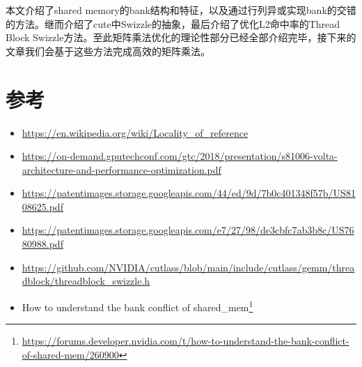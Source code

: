 本文介绍了shared memory的bank结构和特征，以及通过行列异或实现bank的交错的方法。继而介绍了cute中Swizzle的抽象，最后介绍了优化L2命中率的Thread Block Swizzle方法。至此矩阵乘法优化的理论性部分已经全部介绍完毕，接下来的文章我们会基于这些方法完成高效的矩阵乘法。

\section{参考}

\begin{itemize}
  \item \url{https://en.wikipedia.org/wiki/Locality_of_reference}
  \item \url{https://on-demand.gputechconf.com/gtc/2018/presentation/s81006-volta-architecture-and-performance-optimization.pdf}
  \item \url{https://patentimages.storage.googleapis.com/44/ed/9d/7b0c401348f57b/US8108625.pdf}
  \item \url{https://patentimages.storage.googleapis.com/e7/27/98/de3cbfc7ab3b8c/US7680988.pdf}
  \item \url{https://github.com/NVIDIA/cutlass/blob/main/include/cutlass/gemm/threadblock/threadblock_swizzle.h}
  \item How to understand the bank conflict of shared\_mem\footnote{\url{https://forums.developer.nvidia.com/t/how-to-understand-the-bank-conflict-of-shared-mem/260900}}
\end{itemize}
